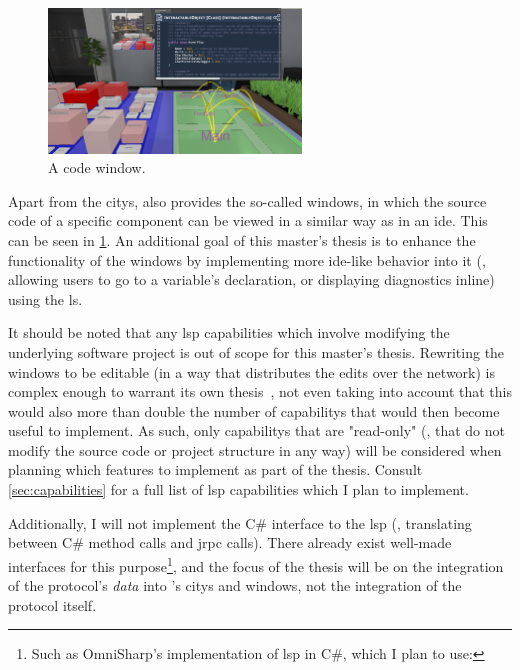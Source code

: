 \documentclass[../thesis]{subfiles}
\begin{document}
\begin{figure}
	\centering
	\includegraphics[width=0.6\textwidth,trim={30.5cm 22cm 6cm 0},clip]{../figures/SEE_readme}
	\caption{A code window.}\label{fig:window}
\end{figure}

Apart from the \glspl{city}, \SEE{} also provides the so-called \glspl*{window}, in which the source code of a specific component can be viewed in a similar way as in an \gls{ide}.
This can be seen in \cref{fig:window}.
An additional goal of this master's thesis is to enhance the functionality of the \glspl{window} by implementing more \gls{ide}-like behavior into it (\eg, allowing users to go to a variable's declaration, or displaying diagnostics inline) using the \gls{ls}.

It should be noted that any \gls{lsp} capabilities which involve modifying the underlying software project is out of scope for this master's thesis.
Rewriting the \glspl{window} to be editable (in a way that distributes the edits over the network) is complex enough to warrant its own thesis~\cite[see also][]{moritz}, not even taking into account that this would also more than double the number of \glspl{capability} that would then become useful to implement.
As such, only \glspl{capability} that are "read-only" (\ie, that do not modify the source code or project structure in any way) will be considered when planning which features to implement as part of the thesis.
Consult \cref{sec:capabilities} for a full list of \gls{lsp} capabilities which I plan to implement.

Additionally, I will not implement the C\# interface to the \gls{lsp} (\ie, translating between C\# method calls and \gls{jrpc} calls).
There already exist well-made interfaces for this purpose\footnote{
	Such as OmniSharp's implementation of \gls{lsp} in C\#, which I plan to use:
}, and the focus of the thesis will be on the integration of the protocol's \emph{data} into \SEE{}'s \glspl{city} and \glspl{window}, not the integration of the protocol itself.
\end{document}
